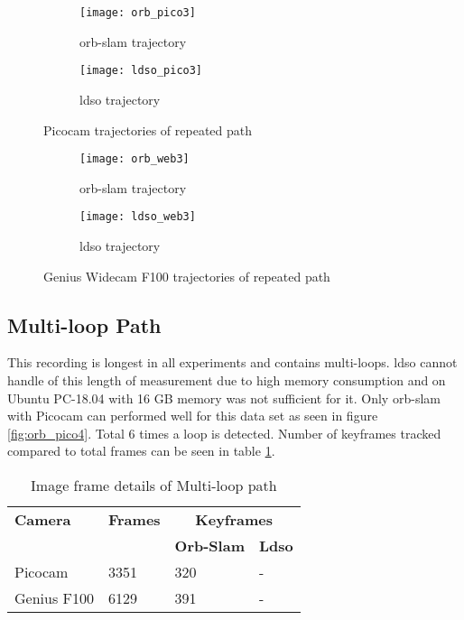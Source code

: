 \begin{figure}[H]
	\begin{subfigure}{.6\textwidth}
		\centering
		\texttt{[image: orb\_pico3]}
		\caption{\acrshort{orb}-\acrshort{slam} trajectory}
		\label{fig:orb_pico3}
	\end{subfigure}
	\begin{subfigure}{.5\textwidth}
		\centering
		\texttt{[image: ldso\_pico3]}
		\caption{\acrshort{ldso} trajectory}
		\label{fig:ldso_pico3}
	\end{subfigure}
	\caption{Picocam trajectories of repeated path}
	\label{fig:Pico3}
\end{figure}
\begin{figure}[H]
	\begin{subfigure}{.6\textwidth}
		\centering
		\texttt{[image: orb\_web3]}
		\caption{\acrshort{orb}-\acrshort{slam} trajectory}
		\label{fig:orb_web3}
	\end{subfigure}%
	\begin{subfigure}{.5\textwidth}
		\centering
		\texttt{[image: ldso\_web3]}
		\caption{\acrshort{ldso} trajectory}
		\label{fig:ldso_web3}
	\end{subfigure}
	\caption{Genius Widecam F100 trajectories of repeated path}
	\label{fig:Web3}
\end{figure}

\subsection{Multi-loop Path}
This recording is longest in all experiments and contains multi-loops. \acrshort{ldso} cannot handle of this length of measurement due to high memory consumption and on Ubuntu PC-18.04 with 16 GB memory was not sufficient for it. Only \acrshort{orb}-\acrshort{slam} with Picocam can performed well for this data set as seen in figure \ref{fig:orb_pico4}. Total 6 times a loop is detected. Number of keyframes tracked compared to total frames can be seen in table \ref{table:multi-loop}. 
\begin{table}[H]
	\centering
	\renewcommand{\arraystretch}{1.5}
	\begin{tabular}{ l| l| l |l }
		\textbf{Camera} & \textbf{Frames} & \multicolumn{2}{c}{\textbf{Keyframes}}  \\    
		&      & \textbf{Orb-Slam}  & \textbf{Ldso}  \\
		\hline
		Picocam & 3351 & 320   & - \\ 
		\hline
		Genius F100 & 6129  &  391  & - \\ 
	\end{tabular}
	\caption{Image frame details of Multi-loop path}
	\label{table:multi-loop}
\end{table}


